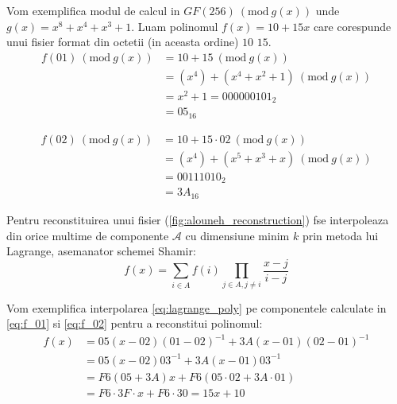 \documentclass{llncs}
\newcommand{\Mod}[1]{\ (\text{mod}\ #1)}
\begin{document}

\begin{example}
Vom exemplifica modul de calcul in $GF(256) \Mod {g(x)} $ unde $g(x) = x ^ 8 + x ^ 4 + x ^ 3 + 1$. Luam polinomul $f(x) = 10 + 15x$ care corespunde unui fisier format din octetii (in aceasta ordine) $10$ $15$.
	\begin{equation} \label{eq:f_01}
	\begin{split}
		f(01) \Mod{g(x)} & = 10 + 15 \Mod{g(x)} \\
		& = (x ^ 4) + (x ^ 4 + x ^ 2 + 1) \Mod{g(x)} \\
		& = x ^ 2 + 1 = 000000101_2 \\
		& =  05_{16}
	\end{split}
	\end{equation}

	\begin{equation} \label{eq:f_02}
	\begin{split}
	 f(02) \Mod{g(x)} & = 10 + 15\cdot02 \Mod{g(x)} \\
	 & = (x ^ 4) + (x ^ 5 + x ^ 3 + x) \Mod{g(x)} \\
	 & = 00111010_2 \\
	 & = 3A_{16}
	 \end{split}
	 \end{equation}
\end{example}
Pentru reconstituirea unui fisier (\ref{fig:alouneh_reconstruction}) fse interpoleaza din orice multime de componente $\mathcal{A}$ cu dimensiune minim $k$ prin metoda lui Lagrange, asemanator schemei Shamir:
\begin{equation}
	\label{eq:lagrange_poly}
	f(x)=\sum_{i \in A} f(i) \prod_{j \in A, j \neq i} \frac{x-j}{i-j}
\end{equation}

\begin{example}
Vom exemplifica interpolarea \ref{eq:lagrange_poly} pe componentele calculate in  \ref{eq:f_01} si \ref{eq:f_02} pentru a reconstitui polinomul:
	\begin{equation}
	\begin{split}
		f(x) & = 05(x - 02)(01 - 02)^{-1} + 3A(x - 01)(02 - 01)^{-1} \\
		& = 05(x - 02)03^{-1} + 3A(x - 01)03^{-1} \\
		& = F6(05 + 3A)x + F6(05\cdot02 + 3A \cdot 01) \\
		& = F6\cdot 3F\cdot x + F6\cdot30 = 15x + 10
	\end{split}
	\end{equation}
\end{example}
\end{document}
